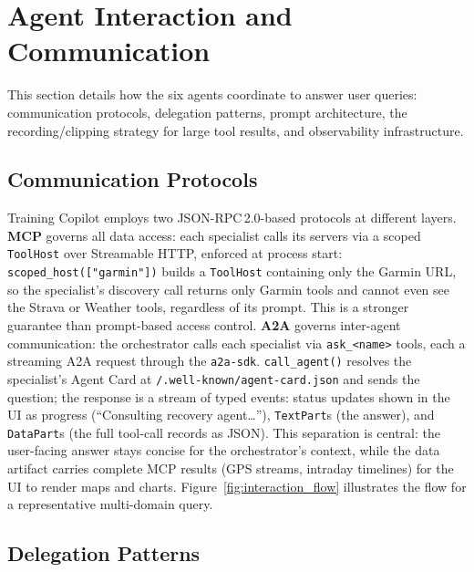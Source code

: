 \section{Agent Interaction and Communication}\label{sec:agents}

This section details how the six agents coordinate to answer user queries: communication protocols, delegation patterns, prompt architecture, the recording/clipping strategy for large tool results, and observability infrastructure.

\subsection{Communication Protocols}\label{sec:agents:protocols}

Training Copilot employs two JSON-RPC\,2.0-based protocols at different layers. \textbf{MCP} governs all data access: each specialist calls its servers via a scoped \texttt{ToolHost} over Streamable HTTP, enforced at process start: \texttt{scoped\_host(["garmin"])} builds a \texttt{ToolHost} containing only the Garmin URL, so the specialist's discovery call returns only Garmin tools and cannot even see the Strava or Weather tools, regardless of its prompt. This is a stronger guarantee than prompt-based access control. \textbf{A2A} governs inter-agent communication: the orchestrator calls each specialist via \texttt{ask\_<name>} tools, each a streaming A2A request through the \texttt{a2a-sdk}. \texttt{call\_agent()} resolves the specialist's Agent Card at \texttt{/.well-known/agent-card.json} and sends the question; the response is a stream of typed events: status updates shown in the UI as progress (``Consulting recovery agent\ldots''), \texttt{TextPart}s (the answer), and \texttt{DataPart}s (the full tool-call records as JSON). This separation is central: the user-facing answer stays concise for the orchestrator's context, while the data artifact carries complete MCP results (GPS streams, intraday timelines) for the UI to render maps and charts. Figure~\ref{fig:interaction_flow} illustrates the flow for a representative multi-domain query.



\subsection{Delegation Patterns}\label{sec:agents:delegation}

